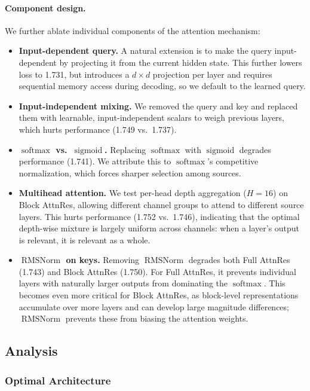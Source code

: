 \paragraph{Component design.}
We further ablate individual components of the attention mechanism:
\begin{itemize}[leftmargin=*]
    \item \textbf{Input-dependent query.} A natural extension is to make the query input-dependent by projecting it from the current hidden state. This further lowers loss to 1.731, but introduces a $d \times d$ projection per layer and requires sequential memory access during decoding, so we default to the learned query.
    \item \textbf{Input-independent mixing.} We removed the query and key and replaced them with learnable, input-independent scalars to weigh previous layers, which hurts performance (1.749 vs.\ 1.737).
    \item \textbf{$\operatorname{softmax}$ vs.\ $\operatorname{sigmoid}$.} Replacing $\operatorname{softmax}$ with $\operatorname{sigmoid}$ degrades performance (1.741). We attribute this to $\operatorname{softmax}$'s competitive normalization, which forces sharper selection among sources.
    \item \textbf{Multihead attention.} We test per-head depth aggregation ($H{=}16$) on Block AttnRes, allowing different channel groups to attend to different source layers. This hurts performance (1.752 vs.\ 1.746), indicating that the optimal depth-wise mixture is largely uniform across channels: when a layer's output is relevant, it is relevant as a whole.
    \item \textbf{$\operatorname{RMSNorm}$ on keys.} Removing $\operatorname{RMSNorm}$ degrades both Full AttnRes (1.743) and Block AttnRes (1.750). For Full AttnRes, it prevents individual layers with naturally larger outputs from dominating the $\operatorname{softmax}$. This becomes even more critical for Block AttnRes, as block-level representations accumulate over more layers and can develop large magnitude differences; $\operatorname{RMSNorm}$ prevents these from biasing the attention weights.
\end{itemize}

\subsection{Analysis}



\subsubsection{Optimal Architecture}
\label{sec:optimal_arch}

